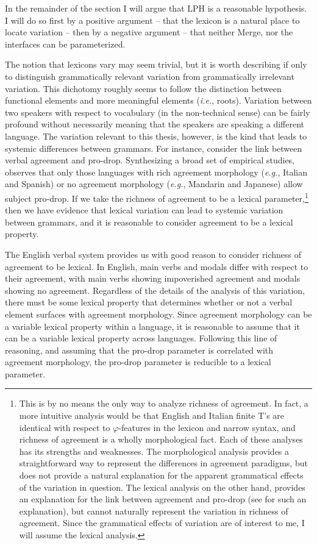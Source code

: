 \documentclass[MilwayThesis]{subfiles}
\begin{document}
In the remainder of the section I will argue that LPH is a reasonable hypothesis.
I will do so first by a positive argument -- that the lexicon is a natural place to locate variation -- then by a negative argument -- that neither Merge, nor the interfaces can be parameterized.

The notion that lexicons vary may seem trivial, but it is worth describing if only to distinguish grammatically relevant variation from grammatically irrelevant variation.
This dichotomy roughly seems to follow the distinction between functional elements and more meaningful elements (\textit{i.e.}, roots).
Variation between two speakers with respect to vocabulary (in the non-technical sense) can be fairly profound without necessarily meaning that the speakers are speaking a different language.
The variation relevant to this thesis, however, is the kind that leads to systemic differences between grammars.
For instance, consider the link between verbal agreement and pro-drop.
Synthesizing a broad set of empirical studies, \textcite{huang1984distribution} observes that only those languages with rich agreement morphology (\textit{e.g.}, Italian and Spanish) or no agreement morphology (\textit{e.g.}, Mandarin and Japanese) allow subject pro-drop.
If we take the richness of agreement to be a lexical parameter,\footnote{
	This is by no means the only way to analyze richness of agreement.
	In fact, a more intuitive analysis would be that English and Italian finite T's are identical with respect to $\varphi$-features in the lexicon and narrow syntax, and richness of agreement is a wholly morphological fact.
	Each of these analyses has its strengths and weaknesses.
	The morphological analysis provides a straightforward way to represent the differences in agreement paradigms, but does not provide a natural explanation for the apparent grammatical effects of the variation in question.
	The lexical analysis on the other hand, provides an explanation for the link between agreement and pro-drop (see \cite{chomsky2015problems} for such an explanation), but cannot naturally represent the variation in richness of agreement.
	Since the grammatical effects of variation are of interest to me, I will assume the lexical analysis.
} then we have evidence that lexical variation can lead to systemic variation between grammars, and it is reasonable to consider agreement to be a lexical property.

The English verbal system provides us with good reason to consider richness of agreement to be lexical.
In English, main verbs and modals differ with respect to their agreement, with main verbs showing impoverished agreement and modals showing no agreement.
Regardless of the details of the analysis of this variation, there must be some lexical property that determines whether or not a verbal element surfaces with agreement morphology.
Since agreement morphology can be a variable lexical property within a language, it is reasonable to assume that it can be a variable lexical property across languages.
Following this line of reasoning, and assuming that the pro-drop parameter is correlated with agreement morphology, the pro-drop parameter is reducible to a lexical parameter.
\end{document}
